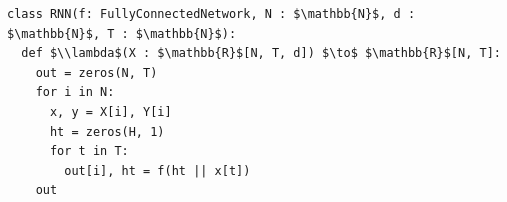 \documentclass[border=10pt]{standalone}
\begin{document}
\begin{lstlisting}
class RNN(f: FullyConnectedNetwork, N : $\mathbb{N}$, d : $\mathbb{N}$, T : $\mathbb{N}$):
  def $\\lambda$(X : $\mathbb{R}$[N, T, d]) $\to$ $\mathbb{R}$[N, T]:
    out = zeros(N, T)
    for i in N:
      x, y = X[i], Y[i] 
      ht = zeros(H, 1)
      for t in T:
        out[i], ht = f(ht || x[t])
    out
\end{lstlisting}
\end{document}
